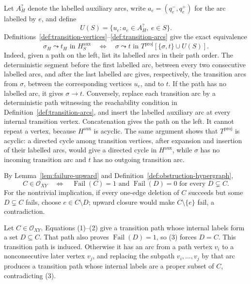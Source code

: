 Let \(A_H^{?}\) denote the labelled auxiliary arcs, write \(a_e=(q_e^-,q_e^+)\) for the arc labelled by \(e\), and define
\[
 U(S)=\{u_e:a_e\in A_H^{?},\ e\in S\}.
\]
Definitions~\ref{def:transition-vertices}--\ref{def:transition-arcs} give the exact equivalence
\[
 \sigma_H\leadsto t_H\text{ in }H^{\mathrm{aux}}_S
 \quad\Longleftrightarrow\quad
 \sigma\leadsto t\text{ in }
 T^{\mathrm{proj}}[\{\sigma,t\}\cup U(S)].
\tag{2}
\]
Indeed, given a path on the left, list its labelled arcs in their path order.  The deterministic segment before the first labelled arc, between every two consecutive labelled arcs, and after the last labelled arc gives, respectively, the transition arcs from \(\sigma\), between the corresponding vertices \(u_e\), and to \(t\).  If the path has no labelled arc, it gives \(\sigma\to t\).  Conversely, replace each transition arc by a deterministic path witnessing the reachability condition in Definition~\ref{def:transition-arcs}, and insert the labelled auxiliary arc at every internal transition vertex.  Concatenation gives the path on the left.  It cannot repeat a vertex, because \(H^{\mathrm{aux}}\) is acyclic.  The same argument shows that \(T^{\mathrm{proj}}\) is acyclic: a directed cycle among transition vertices, after expansion and insertion of their labelled arcs, would give a directed cycle in \(H^{\mathrm{aux}}\), while \(\sigma\) has no incoming transition arc and \(t\) has no outgoing transition arc.

By Lemma~\ref{lem:failure-upward} and Definition~\ref{def:obstruction-hypergraph},
\[
 C\in\mathcal O_{XY}
 \quad\Longleftrightarrow\quad
 \operatorname{Fail}(C)=1
 \text{ and }\operatorname{Fail}(D)=0
 \text{ for every }D\subsetneq C.
\tag{3}
\]
For the nontrivial implication, if every one-edge deletion of \(C\) succeeds but some \(D\subsetneq C\) fails, choose \(e\in C\setminus D\); upward closure would make \(C\setminus\{e\}\) fail, a contradiction.

Let \(C\in\mathcal O_{XY}\).  Equations (1)--(2) give a transition path whose internal labels form a set \(D\subseteq C\).  That path also proves \(\operatorname{Fail}(D)=1\), so (3) forces \(D=C\).  This transition path is induced.  Otherwise it has an arc from a path vertex \(v_i\) to a nonconsecutive later vertex \(v_j\), and replacing the subpath \(v_i,\ldots,v_j\) by that arc produces a transition path whose internal labels are a proper subset of \(C\), contradicting (3).

